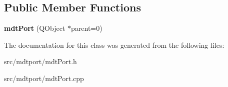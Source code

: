 \subsection*{Public Member Functions}
\begin{DoxyCompactItemize}
\item 
\hypertarget{classmdt_port_ac466eac9d1a54ea0e04c998660ad75ec}{
{\bfseries mdtPort} (QObject $\ast$parent=0)}
\label{classmdt_port_ac466eac9d1a54ea0e04c998660ad75ec}

\end{DoxyCompactItemize}


The documentation for this class was generated from the following files:\begin{DoxyCompactItemize}
\item 
src/mdtport/mdtPort.h\item 
src/mdtport/mdtPort.cpp\end{DoxyCompactItemize}
